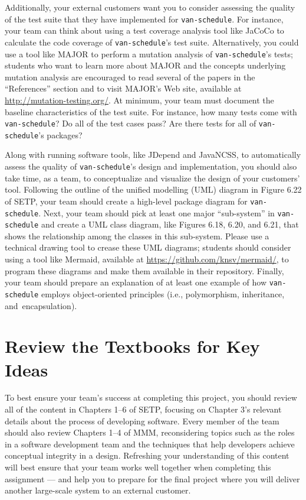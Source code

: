 Additionally, your external customers want you to consider assessing the quality of the test suite that they have
implemented for {\tt van-schedule}. For instance, your team can think about using a test coverage analysis tool like JaCoCo
to calculate the code coverage of {\tt van-schedule}'s test suite. Alternatively, you could use a tool like MAJOR to perform
a mutation analysis of {\tt van-schedule}'s tests; students who want to learn more about MAJOR and the concepts underlying
mutation analysis are encouraged to read several of the papers in the ``References'' section and to visit MAJOR's Web
site, available at \url{http://mutation-testing.org/}. At minimum, your team must document the baseline characteristics
of the test suite. For instance, how many tests come with {\tt van-schedule}? Do all of the test cases pass?  Are there tests
for all of {\tt van-schedule}'s packages?

Along with running software tools, like JDepend and JavaNCSS, to automatically assess the quality of {\tt van-schedule}'s
design and implementation, you should also take time, as a team, to conceptualize and visualize the design of your
customers' tool. Following the outline of the unified modelling (UML) diagram in Figure 6.22 of SETP, your team should
create a high-level package diagram for {\tt van-schedule}. Next, your team should pick at least one major ``sub-system'' in
{\tt van-schedule} and create a UML class diagram, like Figures 6.18, 6.20, and 6.21, that shows the relationship among the
classes in this sub-system. Please use a technical drawing tool to crease these UML diagrams; students should consider
using a tool like Mermaid, available at \url{https://github.com/knsv/mermaid/}, to program these diagrams and make them
available in their repository. Finally, your team should prepare an explanation of at least one example of how
{\tt van-schedule} employs object-oriented principles (i.e., polymorphism, inheritance, \mbox{and encapsulation)}.

\section*{Review the Textbooks for Key Ideas}

To best ensure your team's success at completing this project, you should review all of the content in Chapters 1--6 of
SETP, focusing on Chapter 3's relevant details about the process of developing software. Every member of the team should
also review Chapters 1--4 of MMM, reconsidering topics such as the roles in a software development team and the
techniques that help developers achieve conceptual integrity in a design. Refreshing your understanding of this content
will best ensure that your team works well together when completing this assignment --- and help you to prepare for the
final project where you will deliver another large-scale system to an external customer.

